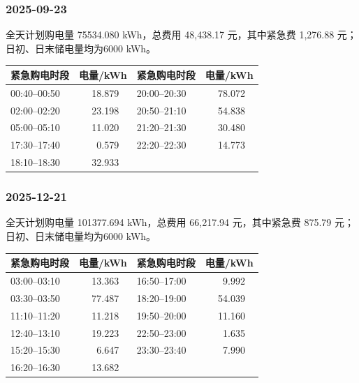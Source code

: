 \subsubsection*{2025-09-23}

\begin{center}\small\quad\end{center}
全天计划购电量 75534.080 kWh，总费用 48,438.17 元，其中紧急费 1,276.88 元；日初、日末储电量均为6000 kWh。
\begin{center}\small
\begin{tabular}{lrlr}\toprule
紧急购电时段 & 电量/kWh & 紧急购电时段 & 电量/kWh\\\midrule
00:40--00:50 & 18.879 \ & 20:00--20:30 & 78.072 \ \\
02:00--02:20 & 23.198 \ & 20:50--21:10 & 54.838 \ \\
05:00--05:10 & 11.020 \ & 21:20--21:30 & 30.480 \ \\
17:30--17:40 & 0.579 \ & 22:20--22:30 & 14.773 \ \\
18:10--18:30 & 32.933 \ &  &  \\
\bottomrule\end{tabular}\end{center}

\subsubsection*{2025-12-21}

\begin{center}\small\quad\end{center}
全天计划购电量 101377.694 kWh，总费用 66,217.94 元，其中紧急费 875.79 元；日初、日末储电量均为6000 kWh。
\begin{center}\small
\begin{tabular}{lrlr}\toprule
紧急购电时段 & 电量/kWh & 紧急购电时段 & 电量/kWh\\\midrule
03:00--03:10 & 13.363 \ & 16:50--17:00 & 9.992 \ \\
03:30--03:50 & 77.487 \ & 18:20--19:00 & 54.039 \ \\
11:10--11:20 & 11.218 \ & 19:50--20:00 & 11.160 \ \\
12:40--13:10 & 19.223 \ & 22:50--23:00 & 1.635 \ \\
15:20--15:30 & 6.647 \ & 23:30--23:40 & 7.990 \ \\
16:20--16:30 & 13.682 \ &  &  \\
\bottomrule\end{tabular}\end{center}